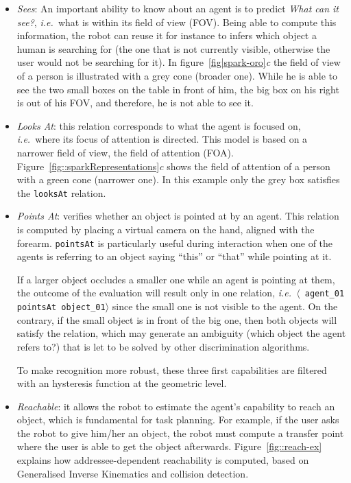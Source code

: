 \documentclass[preprint,3p,times]{elsarticle}
\newcommand{\concept}[1]{{\small \texttt{#1}}}
\newcommand{\stmt}[1]{{\footnotesize \tt $\langle$ #1\relax$\rangle$}}
\newcommand{\ie}{{\textit{i.e.\ }}}
\begin{document}
\begin{itemize}

\item \emph{Sees}: An important ability to know about an agent is to predict
\emph{What can it see?}, \ie what is within its field of view (FOV). Being able
to compute this information, the robot can reuse it for instance to infers
which object a human is searching for (the one that is not currently visible,
otherwise the user would not be searching for it).  In
figure~\ref{fig|spark-oro}\emph{c} the field of view of a person is
illustrated with a grey cone (broader one). While he is able to see the two
small boxes on the table in front of him, the big box on his right is out of
his FOV, and therefore, he is not able to see it. 

\item \emph{Looks At}: this relation corresponds to what the agent is focused
on, \ie where its focus of attention is directed. This model is based on a
narrower field of view, the field of attention (FOA). 
Figure~\ref{fig::sparkRepresentations}\emph{c}
shows the field of attention of a person with a green cone (narrower one). In
this example only the grey box satisfies the \concept{looksAt} relation.

\item \emph{Points At}: verifies whether an object is pointed at by an agent.
    This relation is computed by placing a virtual camera on the hand, aligned
    with the forearm. \concept{pointsAt} is particularly useful during
    interaction when one of the agents is referring to an object saying ``this''
    or ``that'' while pointing at it.
 
If a larger object occludes a smaller one while an agent is pointing at them, the
outcome of the evaluation will result only in one relation, \ie \stmt{agent\_01
pointsAt object\_01} since the small one is not visible to the agent.  On the
contrary, if the small object is in front of the big one, then both objects
will satisfy the relation, which may generate an ambiguity (which object the
agent refers to?) that is let to be solved by other discrimination algorithms.

To make recognition more robust, these three first capabilities are filtered
with an hysteresis function at the geometric level.

\item \emph{Reachable}: it allows the robot to estimate the agent's capability
to reach an object, which is fundamental for task planning. For example, if the
user asks the robot to give him/her an object, the robot must compute a transfer
point where the user is able to get the object afterwards. 
Figure~\ref{fig::reach-ex} explains how addressee-dependent reachability is
computed, based on Generalised Inverse Kinematics and collision detection.

\end{itemize}
\end{document}

